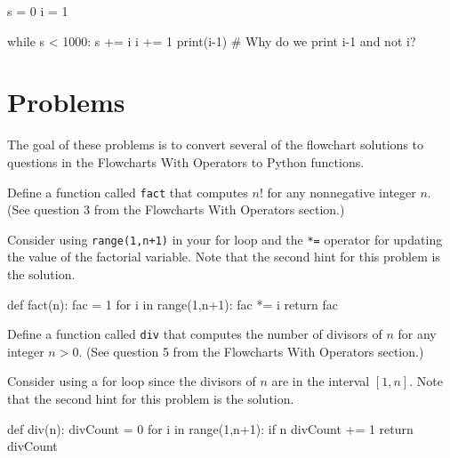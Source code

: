 \documentclass{ximera}
\begin{document}
\begin{sageCell}
s = 0
i = 1

while s < 1000:
        s += i
        i += 1
print(i-1)  # Why do we print i-1 and not i?
\end{sageCell}

\section{Problems}

The goal of these problems is to convert several of the flowchart solutions to questions in the Flowcharts With Operators to Python functions.

\begin{question}
	Define a function called \verb|fact| that computes $n!$ for any nonnegative integer $n$. (See question 3 from the Flowcharts With Operators section.)
	\begin{hint}
	Consider using \verb|range(1,n+1)| in your for loop and the \verb|*=| operator for updating the value of the factorial variable. Note that the second hint for this problem is the solution.
	\end{hint}
	\begin{hint}
\begin{sageCell}
def fact(n):
        fac = 1
        for i in range(1,n+1):
                fac *= i
        return fac
\end{sageCell}
	\end{hint}
\end{question}

\begin{question}
	Define a function called \verb|div| that computes the number of divisors of $n$ for any integer $n>0$. (See question 5 from the Flowcharts With Operators section.)
	\begin{hint}
	Consider using a for loop since the divisors of $n$ are in the interval $[1,n]$. Note that the second hint for this problem is the solution.
	\end{hint}
	\begin{hint}
\begin{sageCell}
def div(n):
        divCount = 0
        for i in range(1,n+1):
                if n%
                        divCount += 1
        return divCount
\end{sageCell}
	\end{hint}
\end{question}
\end{document}
